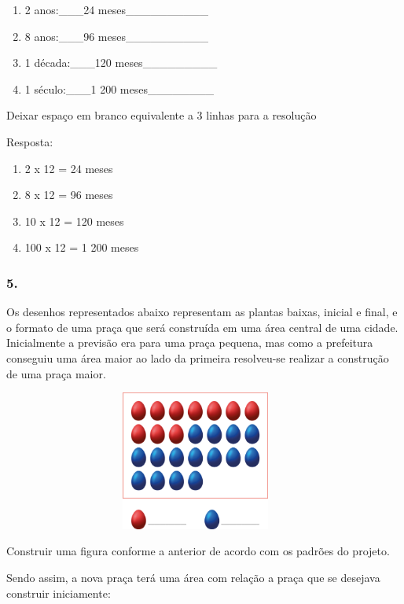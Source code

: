 \begin{enumerate}
\def\labelenumi{\alph{enumi})}
\item
  2 anos:­­­­­­­­­­­­­­­­­­­\_\_\_24 meses\_\_\_\_\_\_\_\_\_\_
\item
  8 anos:\_\_\_96 meses\_\_\_\_\_\_\_\_\_\_
\item
  1 década:\_\_\_120 meses\_\_\_\_\_\_\_\_\_
\item
  1 século:\_\_\_1 200 meses\_\_\_\_\_\_\_\_
\end{enumerate}

Deixar espaço em branco equivalente a 3 linhas para a resolução

Resposta:

\begin{enumerate}
\def\labelenumi{\alph{enumi})}
\item
  2 x 12 = 24 meses
\item
  8 x 12 = 96 meses
\item
  10 x 12 = 120 meses
\item
  100 x 12 = 1 200 meses
\end{enumerate}

\subsubsection{5.}\label{section-56}

Os desenhos representados abaixo representam as plantas baixas, inicial
e final, e o formato de uma praça que será construída em uma área
central de uma cidade. Inicialmente a previsão era para uma praça
pequena, mas como a prefeitura conseguiu uma área maior ao lado da
primeira resolveu-se realizar a construção de uma praça maior.

\includegraphics[width=5.00877in,height=1.80849in]{media/image64.png}

Construir uma figura conforme a anterior de acordo com os padrões do
projeto.

Sendo assim, a nova praça terá uma área com relação a praça que se
desejava construir iniciamente:

